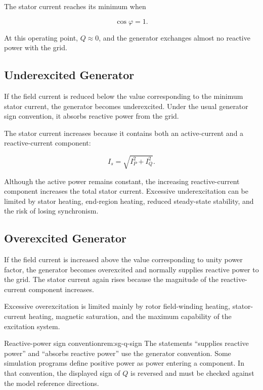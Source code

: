 The stator current reaches its minimum when

\begin{equation}
  \cos\varphi=1.
\end{equation}

At this operating point, $Q\approx0$, and the generator exchanges almost no
reactive power with the grid.

\subsection{Underexcited Generator}

If the field current is reduced below the value corresponding to the minimum
stator current, the generator becomes underexcited. Under the usual generator
sign convention, it absorbs reactive power from the grid.

The stator current increases because it contains both an active-current and a
reactive-current component:

\begin{equation}
  I_s=\sqrt{I_P^2+I_Q^2}.
\end{equation}

Although the active power remains constant, the increasing reactive-current
component increases the total stator current. Excessive underexcitation can be
limited by stator heating, end-region heating, reduced steady-state stability,
and the risk of losing synchronism.

\subsection{Overexcited Generator}

If the field current is increased above the value corresponding to unity power
factor, the generator becomes overexcited and normally supplies reactive power
to the grid. The stator current again rises because the magnitude of the
reactive-current component increases.

Excessive overexcitation is limited mainly by rotor field-winding heating,
stator-current heating, magnetic saturation, and the maximum capability of the
excitation system.

\begin{remark}{Reactive-power sign convention}{rem:sg-q-sign}
The statements ``supplies reactive power'' and ``absorbs reactive power'' use
the generator convention. Some simulation programs define positive power as
power entering a component. In that convention, the displayed sign of $Q$ is
reversed and must be checked against the model reference directions.
\end{remark}


